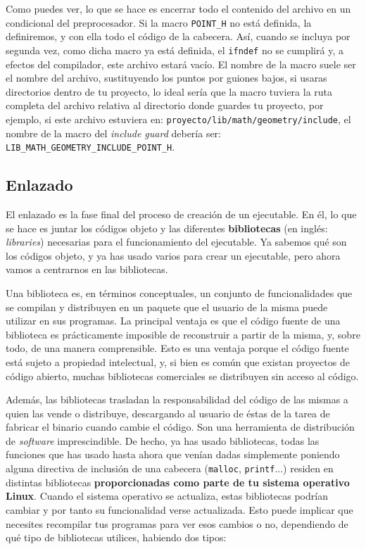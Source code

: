 \documentclass[a4paper]{article}
\begin{document}
Como puedes ver, lo que se hace es encerrar todo el contenido del archivo
en un condicional del preprocesador.
Si la macro \verb!POINT_H! no está definida, la definiremos,
y con ella todo el código de la cabecera. Así, cuando se incluya por segunda
vez, como dicha macro ya está definida, el \verb!ifndef! no se cumplirá y,
a efectos del compilador, este archivo estará vacío. El nombre de la macro
suele ser el nombre del archivo, sustituyendo los puntos por guiones bajos,
si usaras directorios dentro de tu proyecto, lo ideal sería que la macro tuviera
la ruta completa del archivo relativa al directorio donde guardes tu proyecto,
por ejemplo, si este archivo estuviera en:
\verb!proyecto/lib/math/geometry/include!, el nombre de la macro del
\emph{include guard} debería ser:
\verb!LIB_MATH_GEOMETRY_INCLUDE_POINT_H!.


\subsection{Enlazado}
El enlazado es la fase final del proceso de creación de un ejecutable. En él,
lo que se hace es juntar los códigos objeto y las diferentes
\textbf{bibliotecas} (en inglés: \textit{libraries})
necesarias para el funcionamiento del ejecutable. Ya
sabemos qué son los códigos objeto, y ya has usado varios para crear un
ejecutable, pero ahora vamos a centrarnos en las bibliotecas.

Una biblioteca es, en términos conceptuales, un conjunto de funcionalidades que
se compilan y distribuyen en un paquete que el usuario de la misma puede
utilizar en sus programas. La principal ventaja es que el código fuente de una
biblioteca es prácticamente imposible de reconstruir a partir de la misma, y,
sobre todo, de una manera comprensible. Esto es una ventaja porque el código
fuente está sujeto a propiedad intelectual, y, si bien es común que existan
proyectos de código abierto, muchas bibliotecas comerciales se distribuyen sin
acceso al código.

Además, las bibliotecas trasladan la responsabilidad del código de las mismas
a quien las vende o distribuye, descargando al usuario de éstas de la tarea
de fabricar
el binario cuando cambie el código. Son una herramienta de distribución de
\emph{software} imprescindible. De hecho, ya has usado bibliotecas, todas las
funciones que has usado hasta ahora que venían dadas simplemente poniendo
alguna directiva de inclusión de una cabecera (\verb!malloc!, \verb!printf!...)
residen en distintas bibliotecas \textbf{proporcionadas como parte de tu
sistema operativo Linux}. Cuando el sistema operativo se actualiza, estas
bibliotecas podrían cambiar y por tanto su funcionalidad verse actualizada.
Esto puede implicar que necesites recompilar tus programas para ver esos cambios
o no, dependiendo de qué tipo de bibliotecas utilices, habiendo dos tipos:
\end{document}
